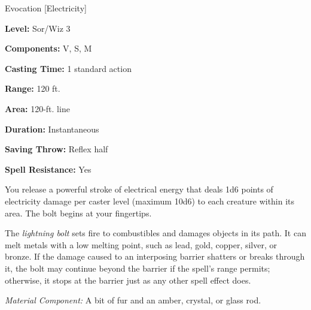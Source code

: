 
Evocation [Electricity]

\textbf{Level:} Sor/Wiz 3

\textbf{Components:} V, S, M

\textbf{Casting Time:} 1 standard action

\textbf{Range:} 120 ft.

\textbf{Area:} 120-ft. line

\textbf{Duration:} Instantaneous

\textbf{Saving Throw:} Reflex half

\textbf{Spell Resistance:} Yes

You release a powerful stroke of electrical energy that deals 1d6 points of electricity 
damage per caster level (maximum 10d6) to each creature within its area. The bolt 
begins at your fingertips.

The \textit{lightning bolt} sets fire to combustibles and damages objects in its 
path. It can melt metals with a low melting point, such as lead, gold, copper, 
silver, or bronze. If the damage caused to an interposing barrier shatters or breaks 
through it, the bolt may continue beyond the barrier if the spell's range permits; 
otherwise, it stops at the barrier just as any other spell effect does.

\textit{Material Component:} A bit of fur and an amber, crystal, or glass rod.


